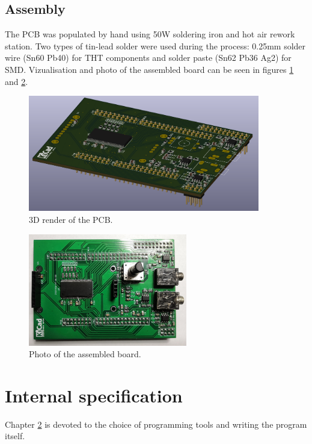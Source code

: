 \documentclass[a4paper,twoside,12pt]{book}
\begin{document}
\section{Assembly}
The PCB was populated by hand using 50W soldering iron and hot air rework station.
Two types of tin-lead solder were used during the process:
0.25mm solder wire (Sn60 Pb40) for THT components and solder paste (Sn62 Pb36 Ag2) for SMD.
Vizualisation and photo of the assembled board can be seen
in figures \ref{fig:pcb3d} and \ref{fig:photo_assembled}.

\begin{figure}[H]
    \centering
    \includegraphics[width=0.9\textwidth]{images/PCB3D}
    \caption{3D render of the PCB.}
    \label{fig:pcb3d}
\end{figure}

\begin{figure}[H]
    \centering
    \includegraphics[width=0.618\textwidth]{images/photo_assembled}
    \caption{Photo of the assembled board.}
    \label{fig:photo_assembled}
\end{figure}



\chapter{Internal specification}\label{ch:internal}
Chapter \ref{ch:internal} is devoted to the choice of
programming tools and writing the program itself.
\end{document}
